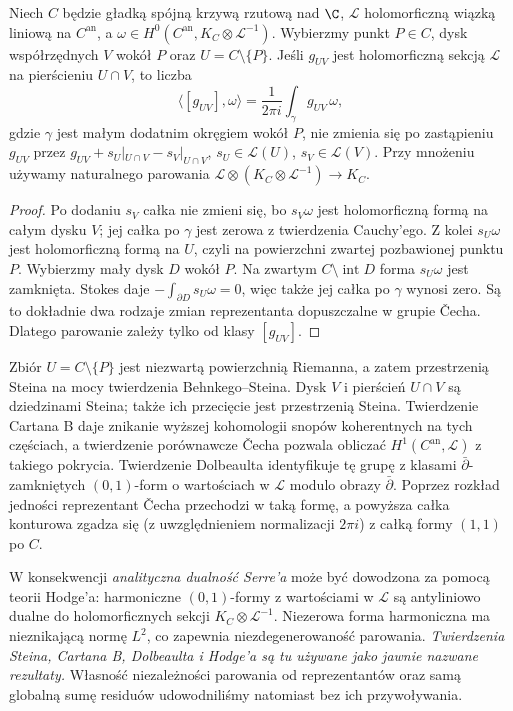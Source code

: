 \begin{stwierdzenie}
\label{st:cech-res-pairing}
Niech $C$ będzie gładką spójną krzywą rzutową nad $\C$,
$\mathcal L$ holomorficzną wiązką liniową na $C^{\mathrm{an}}$,
a $\omega\in H^0(C^{\mathrm{an}},K_C\otimes\mathcal L^{-1})$.
Wybierzmy punkt $P\in C$, dysk współrzędnych $V$
wokół $P$ oraz $U=C\setminus\{P\}$.
Jeśli $g_{UV}$ jest holomorficzną sekcją $\mathcal L$
na pierścieniu $U\cap V$, to liczba
\[
\langle[g_{UV}],\omega\rangle
 =\frac1{2\pi i}\int_{\gamma}g_{UV}\,\omega,
\]
gdzie $\gamma$ jest małym dodatnim okręgiem wokół $P$,
nie zmienia się po zastąpieniu $g_{UV}$ przez
$g_{UV}+s_U|_{U\cap V}-s_V|_{U\cap V}$,
$s_U\in\mathcal L(U)$, $s_V\in\mathcal L(V)$.
Przy mnożeniu używamy naturalnego parowania
$\mathcal L\otimes (K_C\otimes\mathcal L^{-1})\to K_C$.
\end{stwierdzenie}
\begin{proof}
Po dodaniu $s_V$ całka nie zmieni się, bo
$s_V\omega$ jest holomorficzną formą na całym dysku
$V$; jej całka po $\gamma$ jest zerowa z twierdzenia
Cauchy'ego. Z kolei $s_U\omega$ jest holomorficzną
formą na $U$, czyli na powierzchni zwartej pozbawionej
punktu $P$. Wybierzmy mały dysk $D$ wokół $P$.
Na zwartym $C\setminus\operatorname{int}D$
forma $s_U\omega$ jest zamknięta. Stokes daje
$-\int_{\partial D}s_U\omega=0$, więc także
jej całka po $\gamma$ wynosi zero. Są to dokładnie
dwa rodzaje zmian reprezentanta dopuszczalne
w grupie Čecha. Dlatego parowanie zależy tylko
od klasy $[g_{UV}]$.
\end{proof}

\begin{uwaga}
Zbiór $U=C\setminus\{P\}$ jest niezwartą powierzchnią
Riemanna, a zatem przestrzenią Steina na mocy twierdzenia
Behnkego--Steina. Dysk $V$ i pierścień $U\cap V$
są dziedzinami Steina;
także ich przecięcie jest przestrzenią Steina.
Twierdzenie Cartana B daje znikanie wyższej
kohomologii snopów koherentnych na tych częściach,
a twierdzenie porównawcze Čecha pozwala obliczać
$H^1(C^{\mathrm{an}},\mathcal L)$ z takiego pokrycia.
Twierdzenie Dolbeaulta identyfikuje tę grupę
z klasami $\bar\partial$-zamkniętych $(0,1)$-form
o wartościach w $\mathcal L$ modulo obrazy $\bar\partial$.
Poprzez rozkład jedności reprezentant Čecha
przechodzi w taką formę, a powyższa całka konturowa
zgadza się (z uwzględnieniem normalizacji $2\pi i$)
z całką formy $(1,1)$ po $C$.

W konsekwencji \emph{analityczna dualność Serre'a}
może być dowodzona za pomocą teorii Hodge'a:
harmoniczne $(0,1)$-formy z wartościami w
$\mathcal L$ są antyliniowo dualne do
holomorficznych sekcji $K_C\otimes\mathcal L^{-1}$.
Niezerowa forma harmoniczna ma nieznikającą normę
$L^2$, co zapewnia niezdegenerowaność parowania.
\emph{Twierdzenia Steina, Cartana B, Dolbeaulta i Hodge'a
są tu używane jako jawnie nazwane rezultaty.}
Własność niezależności parowania od reprezentantów
oraz samą globalną sumę residuów udowodniliśmy
natomiast bez ich przywoływania.
\end{uwaga}


